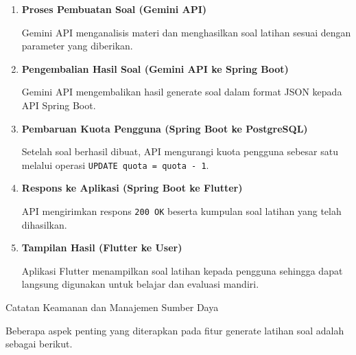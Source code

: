 \documentclass[11pt]{article}
\begin{document}
\begin{enumerate}
API mengirimkan ringkasan materi, tipe soal, dan tingkat kesulitan yang dipilih pengguna ke Gemini API.

\item \textbf{Proses Pembuatan Soal (Gemini API)}

Gemini API menganalisis materi dan menghasilkan soal latihan sesuai dengan parameter yang diberikan.

\item \textbf{Pengembalian Hasil Soal (Gemini API ke Spring Boot)}

Gemini API mengembalikan hasil generate soal dalam format JSON kepada API Spring Boot.

\item \textbf{Pembaruan Kuota Pengguna (Spring Boot ke PostgreSQL)}

Setelah soal berhasil dibuat, API mengurangi kuota pengguna sebesar satu melalui operasi \texttt{UPDATE quota = quota - 1}.

\item \textbf{Respons ke Aplikasi (Spring Boot ke Flutter)}

API mengirimkan respons \texttt{200 OK} beserta kumpulan soal latihan yang telah dihasilkan.

\item \textbf{Tampilan Hasil (Flutter ke User)}

Aplikasi Flutter menampilkan soal latihan kepada pengguna sehingga dapat langsung digunakan untuk belajar dan evaluasi mandiri.

\end{enumerate}

Catatan Keamanan dan Manajemen Sumber Daya

Beberapa aspek penting yang diterapkan pada fitur generate latihan soal adalah sebagai berikut.
\end{document}
